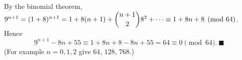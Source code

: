 By the binomial theorem, $9^{n+1}=(1+8)^{n+1}=1+8(n+1)+\dbinom{n+1}{2}8^2+\cdots\equiv1+8n+8\pmod{64}$. Hence
\[9^{n+1}-8n+55\equiv1+8n+8-8n+55=64\equiv0\pmod{64}.\ \blacksquare\]
(For example $n=0,1,2$ give $64$, $128$, $768$.)
